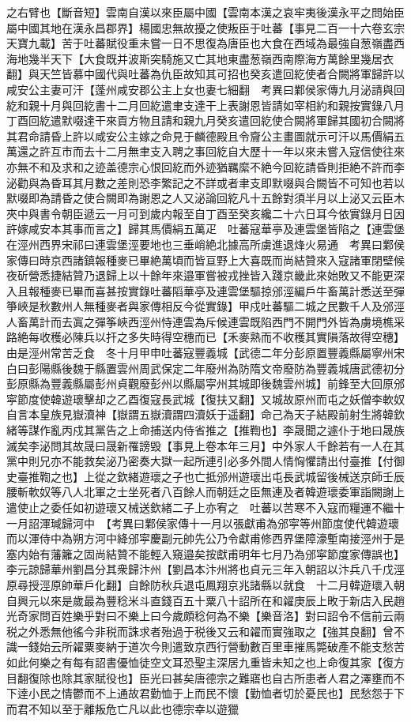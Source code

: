 之右臂也【斷音短】雲南自漢以來臣屬中國【雲南本漢之哀牢夷後漢永平之問始臣屬中國其地在漢永昌郡界】楊國忠無故擾之使叛臣于吐蕃【事見二百一十六卷玄宗天寶九載】苦于吐蕃賦役重未嘗一日不思復為唐臣也大食在西域為最強自葱嶺盡西海地幾半天下【大食既并波斯突騎施又亡其地東盡葱嶺西南際海方萬餘里幾居衣翻】與天竺皆慕中國代與吐蕃為仇臣故知其可招也癸亥遣回紇使者合闕將軍歸許以咸安公主妻可汗【蓬州咸安郡公主上女也妻七細翻　考異曰鄴侯家傳九月泌請與回紇和親十月與回紇書十二月回紇遣聿支達干上表謝恩皆請如宰相約和親按實錄八月丁酉回紇遣默啜達干來貢方物且請和親九月癸亥遣回紇使合闕將軍歸其國初合闕將其君命請昏上許以咸安公主嫁之命見于麟德殿且令齎公主畫圖就示可汗以馬價絹五萬還之許互市而去十二月無聿支入聘之事回紇自大歷十一年以來未嘗入寇信使往來亦無不和及求和之迹盖德宗心恨回紇而外迹猶羈縻不絶今回紇請昏則拒絶不許而李泌勸與為昏耳其月數之差則恐李繁記之不詳或者聿支即默啜與合闕皆不可知也若以默啜即為請昏之使合闕即為謝恩之人又泌論回紇凡十五餘對須半月以上泌又云臣木夾中與書令朝臣遞云一月可到歲内報至自丁酉至癸亥纔二十六日耳今依實錄月日因許嫁咸安本其事而言之】歸其馬價絹五萬疋　吐蕃寇華亭及連雲堡皆陷之【連雲堡在涇州西界宋祁曰連雲堡涇要地也三垂峭絶北據高所虜進退烽火易通　考異曰鄴侯家傳曰時京西諸鎮報種麥已畢絶萬頃而皆亘野上大喜既而尚結贊來入寇諸軍閉壁候夜斫營悉捷結贊乃退歸上以十餘年來邉軍嘗被戎挫皆入踐京畿此來始敗又不能更深入且報種麥已畢而喜甚按實錄吐蕃䧟華亭及連雲堡驅掠邠涇編戶牛畜萬計悉送至彈箏峽是秋數州人無種麥者與家傳相反今從實錄】甲戍吐蕃驅二城之民數千人及邠涇人畜萬計而去寘之彈筝峽西涇州恃連雲為斥候連雲既陷西門不開門外皆為虜境樵采路絶每收穫必陳兵以扞之多失時得空穗而已【禾麥熟而不收穫其實隕落故得空穗】由是涇州常苦乏食　冬十月甲申吐蕃寇豐義城【武德二年分彭原置豐義縣屬寧州宋白曰彭陽縣後魏于縣置雲州周武保定二年廢州為防隋文帝廢防為豐義城唐武德初分彭原縣為豐義縣屬彭州貞觀廢彭州以縣屬寜州其城即後魏雲州城】前鋒至大回原邠寜節度使韓遊瓌擊却之乙酉復寇長武城【復扶又翻】又城故原州而屯之妖僧李軟奴自言本皇族見嶽瀆神【嶽謂五嶽瀆謂四瀆妖于遥翻】命己為天子結殿前射生將韓欽緒等謀作亂丙戍其黨告之上命捕送内侍省推之【推鞫也】李晟聞之遽仆于地曰晟族滅矣李泌問其故晟曰晟新罹謗毁【事見上卷本年三月】中外家人千餘若有一人在其黨中則兄亦不能救矣泌乃密奏大獄一起所連引必多外間人情恟懼請出付臺推【付御史臺推鞫之也】上從之欽緒遊瓌之子也亡抵邠州遊瓌出屯長武城留後械送京師壬辰腰斬軟奴等八人北軍之士坐死者八百餘人而朝廷之臣無連及者韓遊瓌委軍詣闕謝上遣使止之委任如初遊瓌又械送欽緒二子上亦宥之　吐蕃以苦寒不入寇而糧運不繼十一月詔渾瑊歸河中　【考異曰鄴侯家傳十一月以張獻甫為邠寜等州節度使代韓遊瓌而以渾侍中為朔方河中絳邠寜慶副元帥先公乃令獻甫修西界堡障濠塹南接涇州于是塞内始有藩籬之固尚結贊不能輕入窺邉矣按獻甫明年七月乃為邠寜節度家傳誤也】李元諒歸華州劉昌分其衆歸汴州【劉昌本汴州將也貞元三年入朝詔以汴兵八千戊涇原尋授涇原帥華戶化翻】自餘防秋兵退屯鳳翔京兆諸縣以就食　十二月韓遊瓌入朝　自興元以來是歲最為豐稔米斗直錢百五十粟八十詔所在和糴庚辰上畋于新店入民趙光奇家問百姓樂乎對曰不樂上曰今歲頗稔何為不樂【樂音洛】對曰詔令不信前云兩税之外悉無他徭今非税而誅求者殆過于税後又云和糴而實強取之【強其良翻】曾不識一錢始云所糴粟麥納于道次今則遣致京西行營動數百里車摧馬斃破產不能支愁苦如此何樂之有每有詔書優恤徒空文耳恐聖主深居九重皆未知之也上命復其家【復方目翻復除也除其家賦役也】臣光曰甚矣唐德宗之難寤也自古所患者人君之澤壅而不下逹小民之情鬱而不上通故君勤恤于上而民不懷【勤恤者切於憂民也】民愁怨于下而君不知以至于離叛危亡凡以此也德宗幸以遊獵